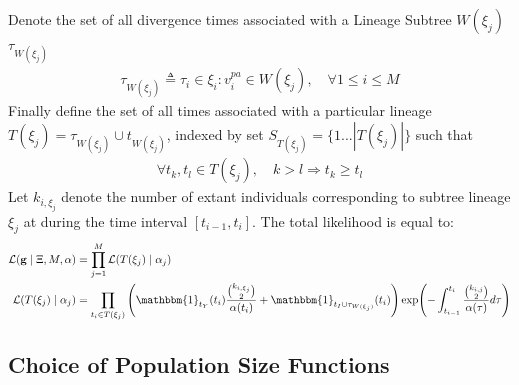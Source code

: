\documentclass{report}
\theoremstyle{definition}
\begin{document}
Denote the set of all divergence times associated with a Lineage Subtree $W(\xi_j)$ $\tau_{W(\xi_j)}$
\begin{gather*}
\tau_{W(\xi_j)} \triangleq \tau_i \in \xi_i : v^{pa}_i \in W(\xi_j), \quad \forall 1\leq i\leq M
\end{gather*}
Finally define the set of all times associated with a particular lineage
$T(\xi_j) = \tau_{W(\xi_j)}\cup t_{W(\xi_j)}$, indexed by set $S_{T(\xi_j)}=\{1 ... |T(\xi_j)|\}$ such that
\begin{gather*}
\forall t_k, t_l \in T(\xi_j),\quad k>l \Rightarrow t_k \geq t_l
\end{gather*}
Let $k_{i,\xi_j}$ denote the number of extant individuals corresponding to subtree lineage $\xi_j$ at during the time interval $[t_{i-1}, t_i]$.
The total likelihood is equal to:
\begin{gather}
\begin{aligned}
\mathcal{L}(\mathbf{g}\mid \Xi, M, \mathbf{\alpha}) &= \prod_{j=1}^{M}\mathcal{L}(T(\xi_j) \mid \alpha_j) \\
\mathcal{L}(T(\xi_j) \mid \alpha_j) &= \prod_{t_i\in T(\xi_j)}\left(\mathbbm{1}_{t_Y}(t_i) \frac{\binom{k_{i,\xi_j}}{2}}{\alpha(t_i)}+\mathbbm{1}_{t_I\cup\tau_{W(\xi_j)}}(t_i)\right)
\exp(-\int_{t_{i-1}}^{t_i}\frac{\binom{k_{i,j}}{2}}{\alpha(\tau)}d\tau)
\end{aligned}
\end{gather}
\subsection{Choice of Population Size Functions}
\end{document}
